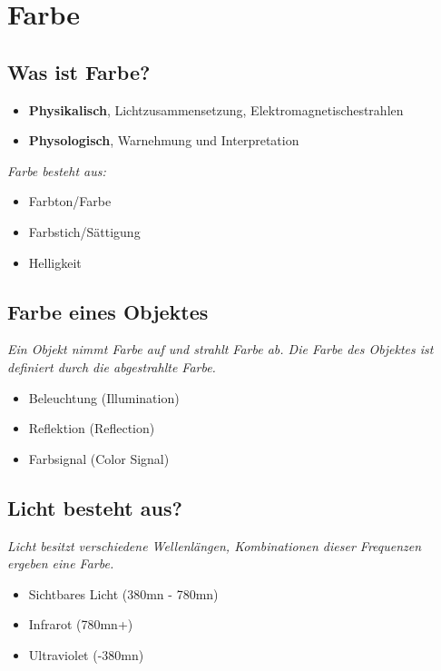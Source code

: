 \section{Farbe}

\subsection{Was ist Farbe?}

\begin{itemize}
    \item \textbf{Physikalisch}, Lichtzusammensetzung, Elektromagnetischestrahlen
    \item \textbf{Physologisch}, Warnehmung und Interpretation
\end{itemize}

\textit{Farbe besteht aus:}

\begin{itemize}
    \item Farbton/Farbe
    \item Farbstich/Sättigung
    \item Helligkeit
\end{itemize}

\subsection{Farbe eines Objektes}

\textit{
    Ein Objekt nimmt Farbe auf und strahlt Farbe ab.
    Die Farbe des Objektes ist definiert durch die abgestrahlte
    Farbe.
}

\begin{itemize}
    \item Beleuchtung (Illumination)
    \item Reflektion (Reflection)
    \item Farbsignal (Color Signal)
\end{itemize}

\subsection{Licht besteht aus?}

\textit{
    Licht besitzt verschiedene Wellenlängen,
    Kombinationen dieser Frequenzen ergeben eine Farbe.
}

\begin{itemize}
    \item Sichtbares Licht (380mn - 780mn)
    \item Infrarot (780mn+)
    \item Ultraviolet (-380mn)
\end{itemize}

